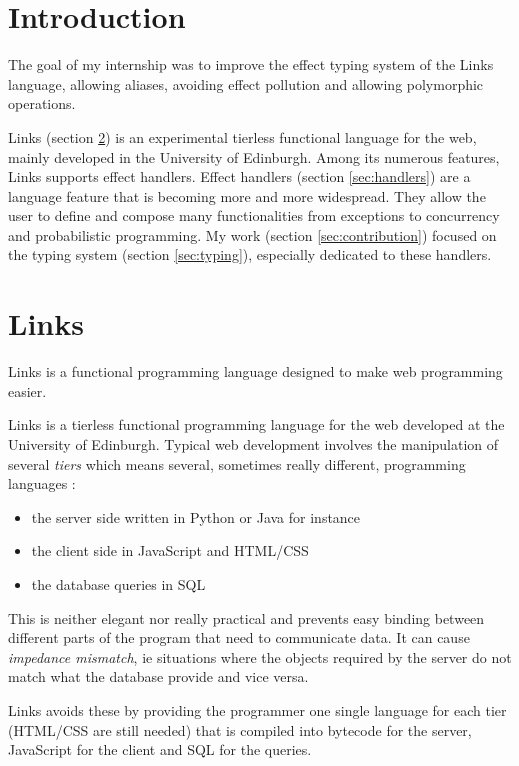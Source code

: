 \documentclass[10pt, nonacm=true, language=french, language=english]{acmart}
\begin{document}
\section{Introduction}

The goal of my internship was to improve the effect typing system of the Links language, allowing aliases, avoiding effect pollution and allowing polymorphic operations.

Links (section \ref{sec:links}) is an experimental tierless functional language for the web, mainly developed in the University of Edinburgh. Among its numerous features, Links supports effect handlers. Effect handlers (section \ref{sec:handlers}) are a language feature that is becoming more and more widespread. They allow the user to define and compose many functionalities from exceptions to concurrency and probabilistic programming. My work (section \ref{sec:contribution}) focused on the typing system (section \ref{sec:typing}), especially dedicated to these handlers.


\section{Links}
\label{sec:links}

\begin{fquote}
 Links is a functional programming language designed to make web programming easier.
\end{fquote}

Links \citep{links} is a tierless functional programming language for the web developed at the University of Edinburgh. Typical web development involves the manipulation of several \emph{tiers} which means several, sometimes really different, programming languages :
\begin{itemize}
  \item the server side written in Python or Java for instance
  \item the client side in JavaScript and HTML/CSS
  \item the database queries in SQL
\end{itemize}
This is neither elegant nor really practical and prevents easy binding between different parts of the program that need to communicate data. It can cause \emph{impedance mismatch}, ie situations where the objects required by the server do not match what the database provide and vice versa.

Links avoids these by providing the programmer one single language for each tier (HTML/CSS are still needed) that is compiled into bytecode for the server, JavaScript for the client and SQL for the queries.
\end{document}
